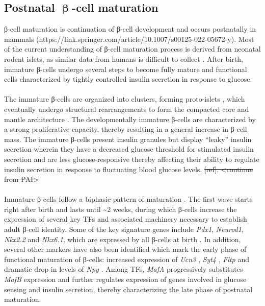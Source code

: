 \subsection{Postnatal \( \mathbf{\upbeta} \)-cell maturation} %
\label{sec:betamat}
β-cell maturation is continuation of β-cell development and occurs postnatally in mammals (https://link.springer.com/article/10.1007/s00125-022-05672-y). Most of the current understanding of β-cell maturation process is derived from neonatal rodent islets, as similar data from humans is difficult to collect \textbf{\cite{liu_all_2017, salinno_-cell_2019}}. After birth, immature β-cells undergo several steps to become fully mature and functional cells characterized by tightly controlled insulin secretion in response to glucose.
\\\\
The immature β-cells are organized into clusters, forming proto-islets \textbf{\cite{salinno_-cell_2019}}, which eventually undergo structural rearrangements to form the compacted core and mantle architecture \textbf{\cite{sharon_peninsular_2019}}. The developmentally immature β-cells are characterized by a strong proliferative capacity, thereby resulting in a general increase in β-cell mass. The immature β-cells present insulin granules but display “leaky” insulin secretion wherein they have a decreased glucose threshold for stimulated insulin secretion \textbf{\cite{liu_all_2017, blum_functional_2012}} and are less glucose-responsive thereby affecting their ability to regulate insulin secretion in response to fluctuating blood glucose levels. \st{[ref]. <continue from PAI>}
\\\\
Immature β-cells follow a biphasic pattern of maturation \textbf{\cite{salinno_-cell_2019, stolovich-rain_weaning_2015}}.  The first wave starts right after birth and lasts until \textasciitilde 2 weeks, during which β-cells increase the expression of several key TFs and associated machinery necessary to establish adult β-cell identity. Some of the key signature genes include \textit{Pdx1}, \textit{Neurod1}, \textit{Nkx2.2} and \textit{Nkx6.1}, which are expressed by all β-cells at birth \textbf{\cite{salinno_-cell_2019}}. In addition, several other markers have also been identified which mark the early phase of functional maturation of β-cells: increased expression of \textit{Ucn3} \textbf{\cite{salinno_-cell_2019, blum_functional_2012}}, \textit{Syt4} \textbf{\cite{salinno_-cell_2019, huang_synaptotagmin_2018}}, \textit{Fltp} \textbf{\cite{salinno_-cell_2019, bader_identification_2016}}  and dramatic drop in levels of \textit{Npy} \textbf{\cite{salinno_-cell_2019, rodnoi_neuropeptide_2017}}. Among TFs, \textit{MafA} progressively substitutes \textit{MafB} expression and further regulates expression of genes involved in glucose sensing and insulin secretion, thereby characterizing the late phase of postnatal maturation.
